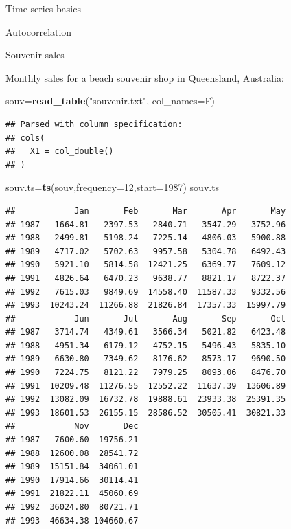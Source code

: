\documentclass[ignorenonframetext,]{beamer}
\newenvironment{Shaded}{\begin{snugshade}}{\end{snugshade}}
\newcommand{\DataTypeTok}[1]{\textcolor[rgb]{0.13,0.29,0.53}{#1}}
\newcommand{\DecValTok}[1]{\textcolor[rgb]{0.00,0.00,0.81}{#1}}
\newcommand{\KeywordTok}[1]{\textcolor[rgb]{0.13,0.29,0.53}{\textbf{#1}}}
\newcommand{\NormalTok}[1]{#1}
\newcommand{\StringTok}[1]{\textcolor[rgb]{0.31,0.60,0.02}{#1}}
\begin{document}
\begin{frame}[fragile]{Time series basics}
\begin{block}{Autocorrelation}
\end{block}

\begin{block}{Souvenir sales}

Monthly sales for a beach souvenir shop in Queensland, Australia:

\begin{Shaded}
\begin{Highlighting}[]
\NormalTok{souv=}\KeywordTok{read_table}\NormalTok{(}\StringTok{"souvenir.txt"}\NormalTok{, }\DataTypeTok{col_names=}\NormalTok{F)}
\end{Highlighting}
\end{Shaded}

\begin{verbatim}
## Parsed with column specification:
## cols(
##   X1 = col_double()
## )
\end{verbatim}

\begin{Shaded}
\begin{Highlighting}[]
\NormalTok{souv.ts=}\KeywordTok{ts}\NormalTok{(souv,}\DataTypeTok{frequency=}\DecValTok{12}\NormalTok{,}\DataTypeTok{start=}\DecValTok{1987}\NormalTok{)}
\NormalTok{souv.ts}
\end{Highlighting}
\end{Shaded}

\begin{verbatim}
##            Jan       Feb       Mar       Apr       May
## 1987   1664.81   2397.53   2840.71   3547.29   3752.96
## 1988   2499.81   5198.24   7225.14   4806.03   5900.88
## 1989   4717.02   5702.63   9957.58   5304.78   6492.43
## 1990   5921.10   5814.58  12421.25   6369.77   7609.12
## 1991   4826.64   6470.23   9638.77   8821.17   8722.37
## 1992   7615.03   9849.69  14558.40  11587.33   9332.56
## 1993  10243.24  11266.88  21826.84  17357.33  15997.79
##            Jun       Jul       Aug       Sep       Oct
## 1987   3714.74   4349.61   3566.34   5021.82   6423.48
## 1988   4951.34   6179.12   4752.15   5496.43   5835.10
## 1989   6630.80   7349.62   8176.62   8573.17   9690.50
## 1990   7224.75   8121.22   7979.25   8093.06   8476.70
## 1991  10209.48  11276.55  12552.22  11637.39  13606.89
## 1992  13082.09  16732.78  19888.61  23933.38  25391.35
## 1993  18601.53  26155.15  28586.52  30505.41  30821.33
##            Nov       Dec
## 1987   7600.60  19756.21
## 1988  12600.08  28541.72
## 1989  15151.84  34061.01
## 1990  17914.66  30114.41
## 1991  21822.11  45060.69
## 1992  36024.80  80721.71
## 1993  46634.38 104660.67
\end{verbatim}


\end{block}
\end{frame}
\end{document}

